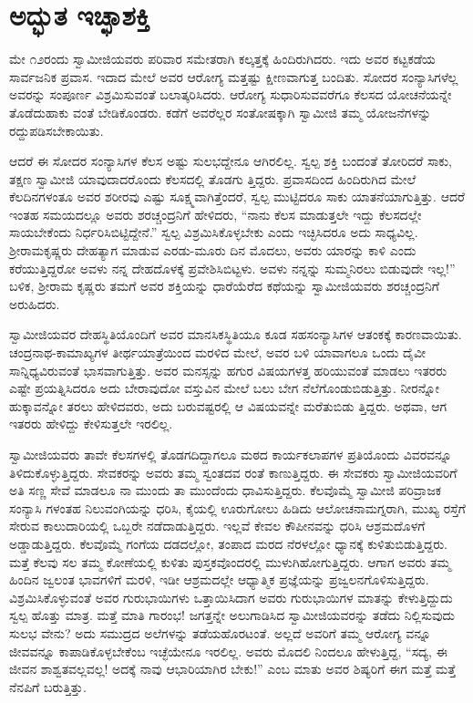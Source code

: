 
\chapter{ಅದ್ಭುತ ಇಚ್ಛಾಶಕ್ತಿ}

\noindent

ಮೇ ೧೨ರಂದು ಸ್ವಾಮೀಜಿಯವರು ಪರಿವಾರ ಸಮೇತರಾಗಿ ಕಲ್ಕತ್ತಕ್ಕೆ ಹಿಂದಿರುಗಿದರು. ಇದು ಅವರ ಕಟ್ಟಕಡೆಯ ಸಾರ್ವಜನಿಕ ಪ್ರವಾಸ. ಇದಾದ ಮೇಲೆ ಅವರ ಆರೋಗ್ಯ ಮತ್ತಷ್ಟು ಕ್ಷೀಣವಾಗುತ್ತ ಬಂದಿತು. ಸೋದರ ಸಂನ್ಯಾಸಿಗಳೆಲ್ಲ ಅವರನ್ನು ಸಂಪೂರ್ಣ ವಿಶ್ರಮಿಸುವಂತೆ ಬಲಾತ್ಕರಿಸಿದರು. ಆರೋಗ್ಯ ಸುಧಾರಿಸುವವರೆಗೂ ಕೆಲಸದ ಯೋಚನೆಯನ್ನೇ ತೊಡೆದುಹಾಕು ವಂತೆ ಬೇಡಿಕೊಂಡರು. ಕಡೆಗೆ ಅವರೆಲ್ಲರ ಸಂತೋಷಕ್ಕಾಗಿ ಸ್ವಾಮೀಜಿ ತಮ್ಮ ಯೋಜನೆಗಳನ್ನು ರದ್ದುಪಡಿಸಬೇಕಾಯಿತು.

ಆದರೆ ಈ ಸೋದರ ಸಂನ್ಯಾಸಿಗಳ ಕೆಲಸ ಅಷ್ಟು ಸುಲಭದ್ದೇನೂ ಆಗಿರಲಿಲ್ಲ. ಸ್ವಲ್ಪ ಶಕ್ತಿ ಬಂದಂತೆ ತೋರಿದರೆ ಸಾಕು, ತಕ್ಷಣ ಸ್ವಾಮೀಜಿ ಯಾವುದಾದರೊಂದು ಕೆಲಸದಲ್ಲಿ ತೊಡಗು ತ್ತಿದ್ದರು. ಪ್ರವಾಸದಿಂದ ಹಿಂದಿರುಗಿದ ಮೇಲೆ ಕೆಲದಿನಗಳಂತೂ ಅವರ ಶರೀರವು ಎಷ್ಟು ಸೂಕ್ಷ್ಮವಾಗಿತ್ತೆಂದರೆ, ಸ್ವಲ್ಪ ಮುಟ್ಟಿದರೂ ಸಾಕು ಯಾತನೆಯಾಗುತ್ತಿತ್ತು. ಆದರೆ ಇಂತಹ ಸಮಯದಲ್ಲೂ ಅವರು ಶರಚ್ಚಂದ್ರನಿಗೆ ಹೇಳಿದರು, “ನಾನು ಕೆಲಸ ಮಾಡುತ್ತಲೇ ಇದ್ದು ಕೆಲಸದಲ್ಲೇ ಸಾಯಬೇಕೆಂದು ನಿರ್ಧರಿಸಿಬಿಟ್ಟಿದ್ದೇನೆ.” ಸ್ವಲ್ಪ ವಿಶ್ರಮಿಸಿಕೊಳ್ಳಬೇಕು ಎಂದು ಇಚ್ಛಿಸಿದರೂ ಅದು ಸಾಧ್ಯವಿಲ್ಲ. ಶ್ರೀರಾಮಕೃಷ್ಣರು ದೇಹತ್ಯಾಗ ಮಾಡುವ ಎರಡು-ಮೂರು ದಿನ ಮೊದಲು, ಅವರು ಯಾರನ್ನು ಕಾಳಿ ಎಂದು ಕರೆಯುತ್ತಿದ್ದರೋ ಅವಳು ನನ್ನ ದೇಹದೊಳಕ್ಕೆ ಪ್ರವೇಶಿಸಿಬಿಟ್ಟಳು. ಅವಳು ನನ್ನನ್ನು ಸುಮ್ಮನಿರಲು ಬಿಡುವುದೇ ಇಲ್ಲ!” ಬಳಿಕ, ಶ್ರೀರಾಮ ಕೃಷ್ಣರು ತಮಗೆ ಅವರ ಶಕ್ತಿಯನ್ನು ಧಾರೆಯೆರೆದ ಕಥೆಯನ್ನು ಸ್ವಾಮೀಜಿಯವರು ಶರಚ್ಚಂದ್ರನಿಗೆ ಅರುಹಿದರು.

ಸ್ವಾಮೀಜಿಯವರ ದೇಹಸ್ಥಿತಿಯೊಂದಿಗೆ ಅವರ ಮಾನಸಿಕಸ್ಥಿತಿಯೂ ಕೂಡ ಸಹಸಂನ್ಯಾಸಿಗಳ ಆತಂಕಕ್ಕೆ ಕಾರಣವಾಯಿತು. ಚಂದ್ರನಾಥ-ಕಾಮಾಖ್ಯಗಳ ತೀರ್ಥಯಾತ್ರೆಯಿಂದ ಮರಳಿದ ಮೇಲೆ, ಅವರ ಬಳಿ ಯಾವಾಗಲೂ ಒಂದು ದೈವೀ ಸಾನ್ನಿಧ್ಯವಿರುವಂತೆ ಭಾಸವಾಗುತ್ತಿತ್ತು. ಅವರ ಮನಸ್ಸನ್ನು ಹಗುರ ವಿಷಯಗಳತ್ತ ಹರಿಯುವಂತೆ ಮಾಡಲು ಇತರರು ಎಷ್ಟೇ ಪ್ರಯತ್ನಿಸಿದರೂ ಅದು ಬೇರಾವುದೋ ವಸ್ತುವಿನ ಮೇಲೆ ಬಲು ಬೇಗ ನೆಲೆಗೊಂಡುಬಿಡುತ್ತಿತ್ತು. ನೀರನ್ನೋ ಹುಕ್ಕಾವನ್ನೋ ತರಲು ಹೇಳಿದವರು, ಅದು ಬರುವಷ್ಟರಲ್ಲಿ ಆ ವಿಷಯವನ್ನೇ ಮರೆತುಬಿಡು ತ್ತಿದ್ದರು. ಅಥವಾ, ಆಗ ಇತರರು ಹೇಳಿದ್ದು ಕೇಳಿಸುತ್ತಲೇ ಇರಲಿಲ್ಲ.

ಸ್ವಾಮೀಜಿಯವರು ತಾವೇ ಕೆಲಸಗಳಲ್ಲಿ ತೊಡಗದಿದ್ದಾಗಲೂ ಮಠದ ಕಾರ್ಯಕಲಾಪಗಳ ಪ್ರತಿಯೊಂದು ವಿವರವನ್ನೂ ತಿಳಿದುಕೊಳ್ಳುತ್ತಿದ್ದರು. ಸೇವಕರನ್ನು ಅವರು ತಮ್ಮ ಸ್ವಂತದವ ರಂತೆ ಕಾಣುತ್ತಿದ್ದರು. ಈ ಸೇವಕರು ಸ್ವಾಮೀಜಿಯವರಿಗೆ ಅತಿ ಸಣ್ಣ ಸೇವೆ ಮಾಡಲೂ ನಾ ಮುಂದು ತಾ ಮುಂದೆಂದು ಧಾವಿಸುತ್ತಿದ್ದರು. ಕೆಲವೊಮ್ಮೆ ಸ್ವಾಮೀಜಿ ಪರಿವ್ರಾಜಕ ಸಂನ್ಯಾಸಿ ಗಳಂತಹ ನಿಲುವಂಗಿಯನ್ನು ಧರಿಸಿ, ಕೈಯಲ್ಲಿ ಊರುಗೋಲು ಹಿಡಿದು ಆಲೋಚನಾಮಗ್ನರಾಗಿ, ಮುಖ್ಯ ರಸ್ತೆಗೆ ಸೇರುವ ಕಾಲುದಾರಿಯಲ್ಲಿ ಒಬ್ಬರೇ ನಡೆದಾಡುತ್ತಿದ್ದರು. ಇಲ್ಲವೆ ಕೇವಲ ಕೌಪೀನವನ್ನು ಧರಿಸಿ ಆಶ್ರಮದೊಳಗೆ ಅಡ್ಡಾಡುತ್ತಿದ್ದರು. ಕೆಲವೊಮ್ಮೆ ಗಂಗೆಯ ದಡದಲ್ಲೋ, ತಂಪಾದ ಮರದ ನೆರಳಲ್ಲೋ ಧ್ಯಾನಕ್ಕೆ ಕುಳಿತುಬಿಡುತ್ತಿದ್ದರು. ಮತ್ತೆ ಕೆಲವು ಸಲ ತಮ್ಮ ಕೋಣೆಯಲ್ಲಿ ಕುಳಿತು ಪುಸ್ತಕವೊಂದರಲ್ಲಿ ಮುಳುಗಿಹೋಗುತ್ತಿದ್ದರು. ಆಗಾಗ ಅವರು ತಮ್ಮ ಹಿಂದಿನ ಜ್ವಲಂತ ಭಾವಗಳಿಗೆ ಮರಳಿ, ಇಡೀ ಆಶ್ರಮದಲ್ಲೇ ಆಧ್ಯಾತ್ಮಿಕ ಪ್ರಜ್ಞೆಯನ್ನು ಪ್ರಜ್ವಲನಗೊಳಿಸುತ್ತಿದ್ದರು. ವಿಶ್ರಮಿಸಿಕೊಳ್ಳುವಂತೆ ಅವರ ಗುರುಭಾಯಿಗಳು ಒತ್ತಾಯಿಸಿದಾಗ ಅವರು ಗುರುಭಾಯಿಗಳ ಮಾತನ್ನು ಕೇಳುತ್ತಿದ್ದುದು ಸ್ವಲ್ಪ ಹೊತ್ತು ಮಾತ್ರ. ಮತ್ತೆ ಮಾತಿ ಗಾರಂಭ! ಜಗತ್ತನ್ನೇ ಅಲುಗಾಡಿಸಿದ ಸ್ವಾಮೀಜಿಯವರನ್ನು ತಡೆದು ನಿಲ್ಲಿಸುವುದು ಸುಲಭ ವೇನು? ಅದು ಸಮುದ್ರದ ಅಲೆಗಳನ್ನು ತಡೆಯಹೊರಟಂತೆ. ಅಲ್ಲದೆ ಅವರಿಗೆ ತಮ್ಮ ಆರೋಗ್ಯ ವನ್ನೂ ಜೀವವನ್ನೂ ಕಾಪಾಡಿಕೊಳ್ಳಬೇಕೆಂಬ ಇಚ್ಛೆಯೇನೂ ಇರಲಿಲ್ಲ. ಅವರು ಮೊದಲಿ ನಿಂದಲೂ ಹೇಳುತ್ತಿದ್ದ, “ಸದ್ಯ, ಈ ಜೀವನ ಶಾಶ್ವತವಲ್ಲವಲ್ಲ! ಅದಕ್ಕೆ ನಾವು ಆಭಾರಿಯಾಗಿರ ಬೇಕು!” ಎಂಬ ಮಾತು ಅವರ ಶಿಷ್ಯರಿಗೆ ಈಗ ಮತ್ತೆ ಮತ್ತೆ ನೆನಪಿಗೆ ಬರುತ್ತಿತ್ತು.

